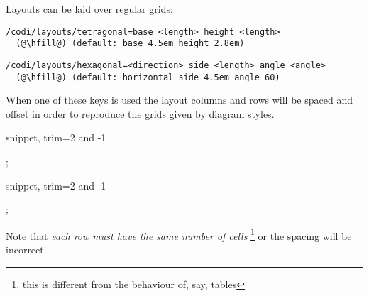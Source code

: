 Layouts can be laid over regular grids:

\begin{lstlisting}
/codi/layouts/tetragonal=base <length> height <length>
  (@\hfill@) (default: base 4.5em height 2.8em)
\end{lstlisting}

\begin{lstlisting}
/codi/layouts/hexagonal=<direction> side <length> angle <angle>
  (@\hfill@) (default: horizontal side 4.5em angle 60)
\end{lstlisting}

When one of these keys is used the layout columns and rows will be
spaced and offset in order to reproduce the grids given by diagram styles.

\begin{tcblisting}{snippet, trim={2 and -1}}
\begin{codi}
  ;
\end{codi}
\end{tcblisting}

\begin{tcblisting}{snippet, trim={2 and -1}}
\begin{codi}
  ;
\end{codi}
\end{tcblisting}

Note that \emph{each row must have the same number of cells}%
\footnote{this is different from the behaviour of, say, tables}
or the spacing will be incorrect.
